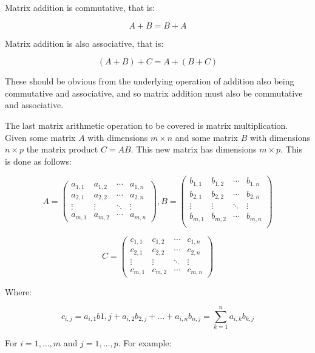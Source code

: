 \documentclass[a4paper,oneside]{report}
\begin{document}
Matrix addition is commutative, that is:

\[ A + B = B + A \]

Matrix addition is also associative, that is:

\[ (A + B) + C = A + (B + C) \]

These should be obvious from the underlying operation of addition also being
commutative and associative, and so matrix addition must also be commutative
and associative.

The last matrix arithmetic operation to be covered is matrix multiplication.
Given some matrix \( A \) with dimensions \( m \times n \) and some matrix
\( B \) with dimensions \( n \times p \) the matrix product \( C = AB \).
This new matrix has dimensions \( m \times p \). This is done as follows:

\[ A = \begin{pmatrix}
	a_{1,1} & a_{1,2} & \cdots & a_{1,n} \\
	a_{2,1} & a_{2,2} & \cdots & a_{2,n} \\
	\vdots  & \vdots  & \ddots & \vdots  \\
	a_{m,1} & a_{m,2} & \cdots & a_{m,n}
\end{pmatrix}, B = \begin{pmatrix}
	b_{1,1} & b_{1,2} & \cdots & b_{1,n} \\
	b_{2,1} & b_{2,2} & \cdots & b_{2,n} \\
	\vdots  & \vdots  & \ddots & \vdots  \\
	b_{m,1} & b_{m,2} & \cdots & b_{m,n} \\
\end{pmatrix} \]

\[ C = \begin{pmatrix}
	c_{1,1} & c_{1,2} & \cdots & c_{1,n} \\
	c_{2,1} & c_{2,2} & \cdots & c_{2,n} \\
	\vdots  & \vdots  & \ddots & \vdots  \\
	c_{m,1} & c_{m,2} & \cdots & c_{m,n}
\end{pmatrix} \]

Where:

\[ c_{i,j} = a_{i,1}b{1,j} + a_{i,2}b_{2,j} + \dots + a_{i,n}b_{n,j} =
\displaystyle\sum_{k=1}^n a_{i,k}b_{k,j} \]

For \( i = 1, \dots, m \) and \( j = 1, \dots, p \). For example:
\end{document}
